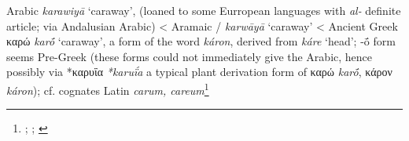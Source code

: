 \begin{etymology}\label{ety:karawiya}
Arabic \textit{karawiyā} `caraway', (loaned to some Eurropean languages with \textit{al-} definite article; via Andalusian Arabic)
< Aramaic {/} \textit{karwāyā} `caraway'
< Ancient Greek {καρώ} \textit{karṓ} `caraway', a form of the word \textit{káron}, derived from \textit{káre} `head'; -ṓ form seems Pre-Greek (these forms could not immediately give the Arabic, hence possibly via *καρυΐα \textit{*karuḯa} a typical plant derivation form of καρώ \textit{karṓ}, κάρον \textit{káron}); cf. cognates Latin \textit{carum, careum}\footnote{\textcite[74]{corriente_dictionary_2008}; \textcites[207]{low_aramaeische_1881}[437-438]{low_flora_1924}; \textcites[653]{beekes_etymological_2010}[599]{sokoloff_dictionary_2002}}
\end{etymology}